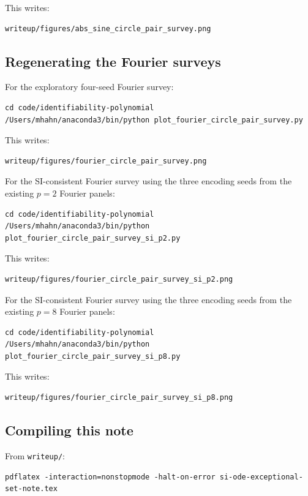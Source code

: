 \documentclass[11pt]{article}
\begin{document}
This writes:
\begin{Verbatim}[fontsize=\small]
writeup/figures/abs_sine_circle_pair_survey.png
\end{Verbatim}

\subsection{Regenerating the Fourier surveys}

For the exploratory four-seed Fourier survey:
\begin{Verbatim}[fontsize=\small]
cd code/identifiability-polynomial
/Users/mhahn/anaconda3/bin/python plot_fourier_circle_pair_survey.py
\end{Verbatim}

This writes:
\begin{Verbatim}[fontsize=\small]
writeup/figures/fourier_circle_pair_survey.png
\end{Verbatim}

For the SI-consistent Fourier survey using the three encoding seeds from the existing $p=2$ Fourier panels:
\begin{Verbatim}[fontsize=\small]
cd code/identifiability-polynomial
/Users/mhahn/anaconda3/bin/python plot_fourier_circle_pair_survey_si_p2.py
\end{Verbatim}

This writes:
\begin{Verbatim}[fontsize=\small]
writeup/figures/fourier_circle_pair_survey_si_p2.png
\end{Verbatim}

For the SI-consistent Fourier survey using the three encoding seeds from the existing $p=8$ Fourier panels:
\begin{Verbatim}[fontsize=\small]
cd code/identifiability-polynomial
/Users/mhahn/anaconda3/bin/python plot_fourier_circle_pair_survey_si_p8.py
\end{Verbatim}

This writes:
\begin{Verbatim}[fontsize=\small]
writeup/figures/fourier_circle_pair_survey_si_p8.png
\end{Verbatim}

\subsection{Compiling this note}

From \texttt{writeup/}:
\begin{Verbatim}[fontsize=\small]
pdflatex -interaction=nonstopmode -halt-on-error si-ode-exceptional-set-note.tex
\end{Verbatim}
\end{document}

